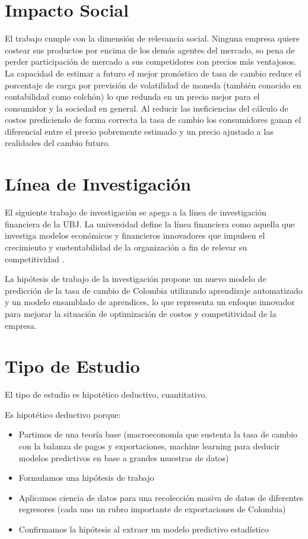 \section{Impacto Social}
El trabajo cumple con la dimensión de relevancia social. Ninguna empresa quiere costear sus productos por encima de los demás agentes del mercado, so pena de perder participación de mercado a sus competidores con precios más ventajosos. La capacidad de estimar a futuro el mejor pronóstico de tasa de cambio reduce el porcentaje de carga por previsión de volatilidad de moneda (también conocido en contabilidad como colchón) lo que redunda en un precio mejor para el consumidor y la sociedad en general. Al reducir las ineficiencias del cálculo de costos prediciendo de forma correcta la tasa de cambio los consumidores ganan el diferencial entre el precio pobremente estimado y un precio ajustado a las realidades del cambio futuro.

\section{Línea de Investigación}
El siguiente trabajo de investigación se apega a la línea de investigación financiera de la UBJ. La universidad define la línea financiera como aquella que investiga modelos económicos y financieros innovadores que impulsen el crecimiento y sustentabilidad de la organización a fin de relevar su competitividad \cite{guiaAcademicaDAG}. 

La hipótesis de trabajo de la investigación propone un nuevo modelo de predicción de la tasa de cambio de Colombia utilizando aprendizaje automatizado y un modelo ensamblado de aprendices, lo que representa un enfoque innovador para mejorar la situación de optimización de costos y competitividad de la empresa. 

\section{Tipo de Estudio}
El tipo de estudio es hipotético deductivo, cuantitativo.

Es hipotético deductivo porque:

\begin{itemize}
\item Partimos de una teoría base (macroeconomía que sustenta la tasa de cambio con la balanza de pagos y exportaciones, machine learning para deducir modelos predictivos en base a grandes muestras de datos) 
\item Formulamos una hipótesis de trabajo
\item Aplicamos ciencia de datos para una recolección masiva de datos de diferentes regresores (cada uno un rubro importante de exportaciones de Colombia)
\item Confirmamos la hipótesis al extraer un modelo predictivo estadístico  
\end{itemize}

